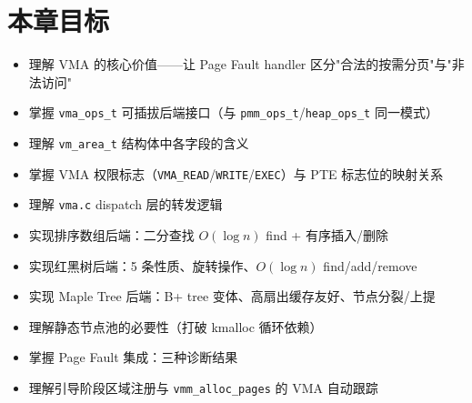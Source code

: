 \section{本章目标}

\begin{itemize}
  \item 理解 VMA 的核心价值——让 Page Fault handler 区分"合法的按需分页"与"非法访问"
  \item 掌握 \texttt{vma\_ops\_t} 可插拔后端接口（与 \texttt{pmm\_ops\_t}/\texttt{heap\_ops\_t} 同一模式）
  \item 理解 \texttt{vm\_area\_t} 结构体中各字段的含义
  \item 掌握 VMA 权限标志（\texttt{VMA\_READ}/\texttt{WRITE}/\texttt{EXEC}）与 PTE 标志位的映射关系
  \item 理解 \texttt{vma.c} dispatch 层的转发逻辑
  \item 实现排序数组后端：二分查找 $O(\log n)$ find + 有序插入/删除
  \item 实现红黑树后端：5 条性质、旋转操作、$O(\log n)$ find/add/remove
  \item 实现 Maple Tree 后端：B+ tree 变体、高扇出缓存友好、节点分裂/上提
  \item 理解静态节点池的必要性（打破 kmalloc 循环依赖）
  \item 掌握 Page Fault 集成：三种诊断结果
  \item 理解引导阶段区域注册与 \texttt{vmm\_alloc\_pages} 的 VMA 自动跟踪
\end{itemize}



